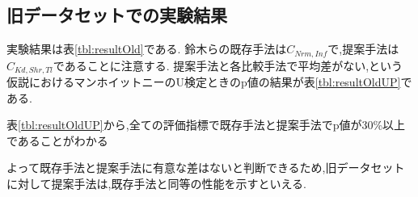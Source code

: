 \subsection{旧データセットでの実験結果}
実験結果は表\ref{tbl:resultOld}である.
鈴木らの既存手法は$C_{Nrm,Inf}$で,提案手法は$C_{Kd,Shr,Tl}$であることに注意する.
提案手法と各比較手法で平均差がない,という仮説におけるマンホイットニーのU検定ときのp値の結果が表\ref{tbl:resultOldUP}である.\par
表\ref{tbl:resultOldUP}から,全ての評価指標で既存手法と提案手法でp値が30\%以上であることがわかる\par
よって既存手法と提案手法に有意な差はないと判断できるため,旧データセットに対して提案手法は,既存手法と同等の性能を示すといえる.
